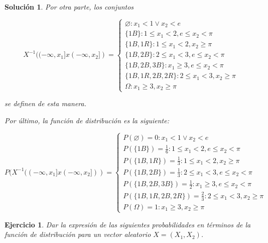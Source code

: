 \documentclass[11pt, a4paper]{article}
\newif\IfInSansMode
\theoremstyle{theorem-style}
\theoremstyle{definition-style}
\newtheorem{ejer}{Ejercicio}[section]
\theoremstyle{remark-style}
\newtheorem*{sol}{Solución}
\theoremstyle{example-style}
\begin{document}
\begin{sol}
	Por otra parte, los conjuntos
	
	\begin{equation}
	X^{-1}((-\infty,x_1]x(-\infty,x_2]) = \left\lbrace
	\begin{array}{ll}
	\varnothing : x_1 < 1 \lor x_2 < e \\
	\{1B\} : 1 \le x_1 < 2, e \le x_2 < \pi \\
	\{1B,1R\} : 1 \le x_1 < 2, x_2 \ge \pi \\
	\{1B,2B\} : 2 \le x_1 < 3, e \le x_2 < \pi \\
	\{1B,2B,3B\} : x_1 \ge 3, e \le x_2 < \pi \\
	\{1B,1R,2B,2R\} : 2 \le x_1 < 3, x_2 \ge \pi \\
	\Omega : x_1 \ge 3, x_2 \ge \pi
	\end{array}
	\right.
	\end{equation} 
	
	se definen de esta manera.
	
	Por último, la función de distribución es la siguiente:
	
	\begin{equation}
	P(X^{-1}((-\infty,x_1]x(-\infty,x_2])) = \left\lbrace
	\begin{array}{ll}
	P({\varnothing}) = 0 : x_1 < 1 \lor x_2 < e \\
	P(\{1B\}) = \frac{1}{6} : 1 \le x_1 < 2, e \le x_2 < \pi \\
	P(\{1B,1R\})= \frac{1}{3} : 1 \le x_1 < 2, x_2 \ge \pi \\
	P(\{1B,2B\})= \frac{1}{3} : 2 \le x_1 < 3, e \le x_2 < \pi \\
	P(\{1B,2B,3B\})= \frac{1}{2} : x_1 \ge 3, e \le x_2 < \pi \\
	P(\{1B,1R,2B,2R\})= \frac{2}{3} : 2 \le x_1 < 3, x_2 \ge \pi \\
	P(\Omega)=1 : x_1 \ge 3, x_2 \ge \pi
	\end{array}
	\right.
	\end{equation} 
	
\end{sol}

\begin{ejer}
Dar la expresión de las siguientes probabilidades en términos de la función de distribución para un vector aleatorio $X=(X_1,X_2)$.
\end{ejer}
\end{document}
